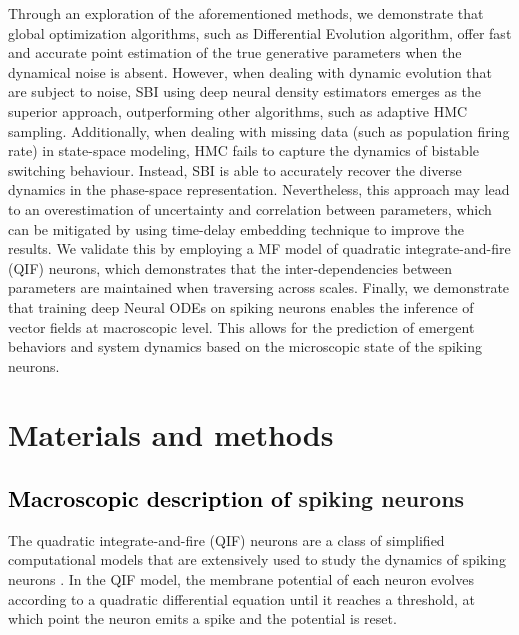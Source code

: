 \documentclass[12pt]{article}
\begin{document}
Through an exploration of the aforementioned methods, we demonstrate that global optimization algorithms, such as Differential Evolution algorithm, offer fast and accurate point estimation of the true generative parameters when the dynamical noise is absent. However, when dealing with dynamic evolution that are subject to noise, SBI using deep neural density estimators emerges as the superior approach, outperforming other algorithms, such as adaptive HMC sampling. Additionally, when dealing with missing data (such as population firing rate) in state-space modeling, HMC fails to capture the dynamics of bistable switching behaviour. Instead, SBI is able to accurately recover the diverse dynamics in the phase-space representation. Nevertheless, this approach may lead to an overestimation of uncertainty and correlation between parameters, which can be mitigated by using time-delay embedding technique to improve the results. We validate this by employing a MF model of quadratic integrate-and-fire (QIF) neurons, which demonstrates that the inter-dependencies between parameters are maintained when traversing across scales. Finally, we demonstrate that training deep Neural ODEs on spiking neurons enables the inference of vector fields at macroscopic level. This allows for the prediction of emergent behaviors and system dynamics based on the microscopic state of the spiking neurons. 



\section{Materials and methods}
\label{Methods}

\subsection{\textcolor{black}{Macroscopic description of} spiking neurons}

The quadratic integrate-and-fire (QIF) neurons are a class of simplified computational models that are extensively used to study the dynamics of spiking neurons \citep{Gerstner2002, Izhikevich2007}. In the QIF model, the membrane potential of \textcolor{black}{each} neuron evolves according to a quadratic differential equation until it reaches a threshold, at which point the neuron emits a spike and the potential is reset.
\end{document}
